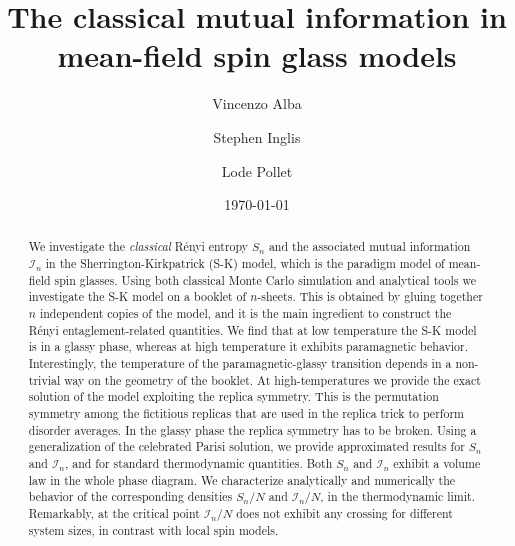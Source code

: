 \documentclass[twocolumn,superscriptaddress,prb,10pt]{revtex4-1}
\begin{document}
\title{The classical mutual information in mean-field spin glass models} 

\author{Vincenzo Alba}
\author{Stephen Inglis}
\author{Lode Pollet}

\date{\today}




\begin{abstract} 

We investigate the \emph{classical} R\'enyi entropy $S_n$ and the associated mutual 
information ${\mathcal I}_n$ in the Sherrington-Kirkpatrick (S-K) model, which is the 
paradigm model of mean-field spin glasses. 
Using both classical Monte Carlo simulation and analytical tools we investigate the 
S-K model on a booklet of $n$-sheets.
This is obtained by gluing together $n$ independent copies of the model, and it is the 
main ingredient to construct the R\'enyi entaglement-related quantities. We find that at 
low temperature the S-K model is in a glassy phase, whereas at high temperature it exhibits 
paramagnetic behavior. Interestingly, the temperature of the paramagnetic-glassy 
transition depends in a non-trivial way on the geometry of the booklet. At high-temperatures 
we provide the exact solution of the model exploiting the replica symmetry. This is the 
permutation symmetry among the fictitious replicas that are used in the replica trick to 
perform disorder averages. In the glassy phase the replica symmetry has to be broken. 
Using a generalization of the celebrated Parisi solution, we provide approximated results 
for $S_n$ and ${\mathcal I}_n$, and for standard thermodynamic quantities. Both $S_n$ 
and ${\mathcal I}_n$ exhibit a volume law in the whole phase diagram. We characterize 
analytically and numerically the behavior of the corresponding densities $S_n/N$ and 
${\mathcal I}_n/N$, in the thermodynamic limit. Remarkably, at the critical point 
${\mathcal I}_n/N$ does not exhibit any crossing for different system sizes, in 
contrast with local spin models. 

\end{abstract}
\end{document}
